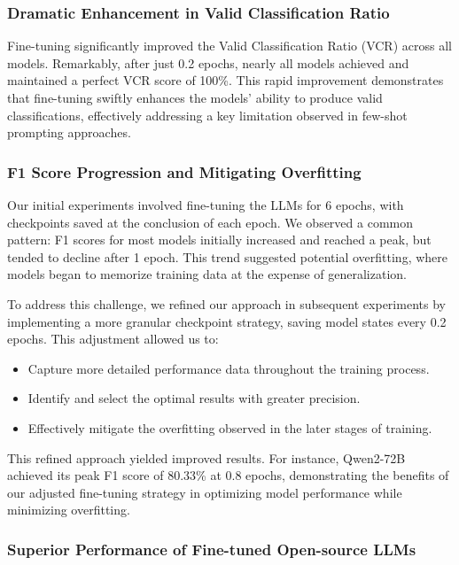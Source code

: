 \subsubsection{Dramatic Enhancement in Valid Classification Ratio}
Fine-tuning significantly improved the Valid Classification Ratio (VCR) across all models. Remarkably, after just 0.2 epochs, nearly all models achieved and maintained a perfect VCR score of 100\%. This rapid improvement demonstrates that fine-tuning swiftly enhances the models' ability to produce valid classifications, effectively addressing a key limitation observed in few-shot prompting approaches.

\subsubsection{F1 Score Progression and Mitigating Overfitting}
Our initial experiments involved fine-tuning the LLMs for 6 epochs, with checkpoints saved at the conclusion of each epoch. We observed a common pattern: F1 scores for most models initially increased and reached a peak, but tended to decline after 1 epoch. This trend suggested potential overfitting, where models began to memorize training data at the expense of generalization.

To address this challenge, we refined our approach in subsequent experiments by implementing a more granular checkpoint strategy, saving model states every 0.2 epochs. This adjustment allowed us to:

\begin{itemize}
    \item Capture more detailed performance data throughout the training process.
    \item Identify and select the optimal results with greater precision.
    \item Effectively mitigate the overfitting observed in the later stages of training.
\end{itemize}

This refined approach yielded improved results. For instance, Qwen2-72B achieved its peak F1 score of 80.33\% at 0.8 epochs, demonstrating the benefits of our adjusted fine-tuning strategy in optimizing model performance while minimizing overfitting.

\subsubsection{Superior Performance of Fine-tuned Open-source LLMs}


